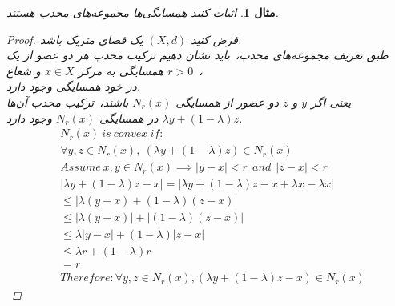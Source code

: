 \documentclass[12pt]{book}
\newtheorem{ex}[thm]{\textbf{مثال}}
\begin{document}
\pagebreak
	\begin{ex}
		اثبات کنید همسایگی‌ها مجموعه‌های محدب هستند.\\
		\vspace{-.7cm}
		\begin{proof}
			فرض کنید \( (X, d) \) یک فضای متریک باشد.\\
			طبق تعریف مجموعه‌های محدب،\ باید نشان دهیم ترکیب محدب هر دو عضو از یک همسایگی به مرکز \( x \in X \) و شعاع \( r>0 \)\ ،\ \\در خود همسایگی وجود دارد.\\
			یعنی اگر \( y \) و \( z \) دو عضور از همسایگی \( N_{r}(x) \) باشند،\ ترکیب محدب آن‌ها
			\( \lambda y + (1-\lambda) z  \)
			در همسایگی \( N_{r}(x) \) وجود دارد.
			\begin{align*}
				&N_{r}(x)\ is\ convex\ if:\\
				&\forall y,z \in N_{r}(x) ,\ (\lambda y + (1-\lambda) z) \in N_{r}(x)\\
				&Assume\ x, y \in N_{r}(x) \implies |y - x|<r\ \  and\ \  |z - x|<r\\
				&|\lambda y +‌(1-\lambda)z - x| = |\lambda y +‌(1-\lambda)z - x + \lambda x - \lambda x|\\
				&\leq |\lambda (y - x) + (1 - \lambda) (z - x)|\\
				&\leq |\lambda (y - x)| + |(1 - \lambda) (z - x)|\\
				&\leq \lambda|y - x| + (1 - \lambda)|z - x|\\
				&\leq \lambda r + (1 - \lambda)r\\
				&= r\\
				&Therefore: \forall y,z \in N_{r}(x), (\lambda y +‌(1-\lambda)z - x) \in N_{r}(x)
			\end{align*}
		\end{proof}
	\end{ex}
\end{document}
